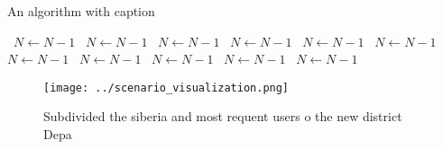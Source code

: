 \documentclass[a4paper]{article}
\begin{document}
\begin{algorithm}
\caption{An algorithm with caption}
\begin{algorithmic}
\    \State $N \gets N - 1$
\    \State $N \gets N - 1$
\    \State $N \gets N - 1$
\    \State $N \gets N - 1$
\    \State $N \gets N - 1$
\    \State $N \gets N - 1$
\    \State $N \gets N - 1$
\    \State $N \gets N - 1$
\    \State $N \gets N - 1$
\    \State $N \gets N - 1$
\    \State $N \gets N - 1$
\EndWhile
\end{algorithmic}
\end{algorithm}

\begin{figure}
\centering
\texttt{[image: ../scenario\_visualization.png]}
\caption{Subdivided the siberia and most requent users o the new district Depa
}
\end{figure}
 
\end{document}
